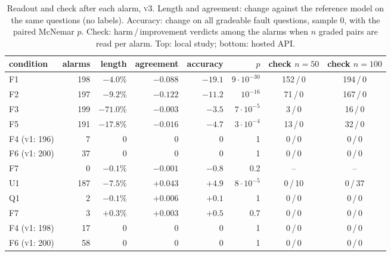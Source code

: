 \documentclass[11pt]{article}
\newcommand{\vone}{\textsc{v1}}
\newcommand{\vthree}{\textsc{v3}}
\begin{document}
\begin{table}[h]
  \centering\small
  \caption{Readout and check after each alarm, \vthree{}. Length and agreement:
  change against the reference model on the same questions (no labels). Accuracy:
  change on all gradeable fault questions, sample 0, with the paired McNemar $p$.
  Check: harm\,/\,improvement verdicts among the alarms when $n$ graded pairs are
  read per alarm. Top: local study; bottom: hosted API.}
  \label{tab:triage}
  \begin{tabular}{lrrrrrcc}
    \toprule
    condition & alarms & length & agreement & accuracy & $p$ & check $n{=}50$ & check $n{=}100$ \\
    \midrule
    F1 & 198 & $-4.0\%$ & $-0.088$ & $-19.1$ & $9\cdot10^{-30}$ & 152\,/\,0 & 194\,/\,0 \\
    F2 & 197 & $-9.2\%$ & $-0.122$ & $-11.2$ & $10^{-16}$ & 71\,/\,0 & 167\,/\,0 \\
    F3 & 199 & $-71.0\%$ & $-0.003$ & $-3.5$ & $7\cdot10^{-5}$ & 3\,/\,0 & 16\,/\,0 \\
    F5 & 191 & $-17.8\%$ & $-0.016$ & $-4.7$ & $3\cdot10^{-4}$ & 13\,/\,0 & 32\,/\,0 \\
    F4 (\vone{}: 196) & 7 & $0$ & $0$ & $0$ & 1 & 0\,/\,0 & 0\,/\,0 \\
    F6 (\vone{}: 200) & 37 & $0$ & $0$ & $0$ & 1 & 0\,/\,0 & 0\,/\,0 \\
    F7 & 0 & $-0.1\%$ & $-0.001$ & $-0.8$ & 0.2 & -- & -- \\
    \midrule
    U1 & 187 & $-7.5\%$ & $+0.043$ & $+4.9$ & $8\cdot10^{-5}$ & 0\,/\,10 & 0\,/\,37 \\
    Q1 & 2 & $-0.1\%$ & $+0.006$ & $+0.1$ & 1 & 0\,/\,0 & 0\,/\,0 \\
    F7 & 3 & $+0.3\%$ & $+0.003$ & $+0.5$ & 0.7 & 0\,/\,0 & 0\,/\,0 \\
    F4 (\vone{}: 198) & 17 & $0$ & $0$ & $0$ & 1 & 0\,/\,0 & 0\,/\,0 \\
    F6 (\vone{}: 200) & 58 & $0$ & $0$ & $0$ & 1 & 0\,/\,0 & 0\,/\,0 \\
    \bottomrule
  \end{tabular}
\end{table}
\end{document}
